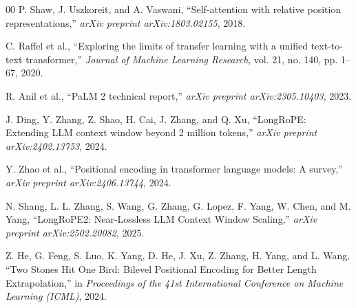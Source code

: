 \documentclass[conference]{IEEEtran}
\begin{document}
\begin{thebibliography}{00}
 P. Shaw, J. Uszkoreit, and A. Vaswani, ``Self-attention with relative position representations,'' \emph{arXiv preprint arXiv:1803.02155}, 2018.

 C. Raffel et al., ``Exploring the limits of transfer learning with a unified text-to-text transformer,'' \emph{Journal of Machine Learning Research}, vol. 21, no. 140, pp. 1--67, 2020.

 R. Anil et al., ``PaLM 2 technical report,'' \emph{arXiv preprint arXiv:2305.10403}, 2023.

 J. Ding, Y. Zhang, Z. Shao, H. Cai, J. Zhang, and Q. Xu, ``LongRoPE: Extending LLM context window beyond 2 million tokens,'' \emph{arXiv preprint arXiv:2402.13753}, 2024.

 Y. Zhao et al., ``Positional encoding in transformer language models: A survey,'' \emph{arXiv preprint arXiv:2406.13744}, 2024.

 N. Shang, L. L. Zhang, S. Wang, G. Zhang, G. Lopez, F. Yang, W. Chen, and M. Yang, ``LongRoPE2: Near-Lossless LLM Context Window Scaling,'' \emph{arXiv preprint arXiv:2502.20082}, 2025.

 Z. He, G. Feng, S. Luo, K. Yang, D. He, J. Xu, Z. Zhang, H. Yang, and L. Wang, ``Two Stones Hit One Bird: Bilevel Positional Encoding for Better Length Extrapolation,'' in \emph{Proceedings of the 41st International Conference on Machine Learning (ICML)}, 2024.
\end{thebibliography}
\end{document}
